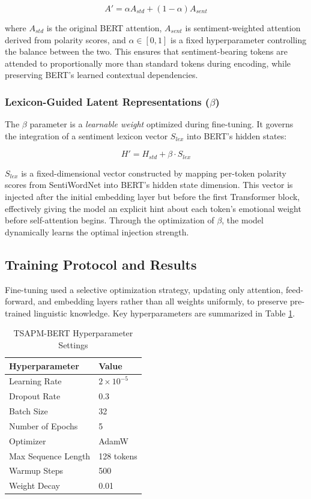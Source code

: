 \documentclass[a4paper,12pt]{article}
\begin{document}
\begin{equation}
    A' = \alpha A_{std} + (1 - \alpha)A_{sent}
\end{equation}

where $A_{std}$ is the original BERT attention, $A_{sent}$ is sentiment-weighted attention derived from polarity scores, and $\alpha \in [0, 1]$ is a fixed hyperparameter controlling the balance between the two. This ensures that sentiment-bearing tokens are attended to proportionally more than standard tokens during encoding, while preserving BERT's learned contextual dependencies.

\subsubsection{Lexicon-Guided Latent Representations ($\beta$)}
The $\beta$ parameter is a \textit{learnable weight} optimized during fine-tuning. It governs the integration of a sentiment lexicon vector $S_{lex}$ into BERT's hidden states:

\begin{equation}
    H' = H_{std} + \beta \cdot S_{lex}
\end{equation}

$S_{lex}$ is a fixed-dimensional vector constructed by mapping per-token polarity scores from SentiWordNet into BERT's hidden state dimension. This vector is injected after the initial embedding layer but before the first Transformer block, effectively giving the model an explicit hint about each token's emotional weight before self-attention begins. Through the optimization of $\beta$, the model dynamically learns the optimal injection strength.

\subsection{Training Protocol and Results}
Fine-tuning used a selective optimization strategy, updating only attention, feed-forward, and embedding layers rather than all weights uniformly, to preserve pre-trained linguistic knowledge. Key hyperparameters are summarized in Table \ref{tab:hyperparameters}.

\begin{table}[H]
\centering
\caption{TSAPM-BERT Hyperparameter Settings}
\label{tab:hyperparameters}
\begin{tabular}{|l|l|}
\hline
\textbf{Hyperparameter} & \textbf{Value} \\ \hline
Learning Rate           & $2 \times 10^{-5}$ \\ \hline
Dropout Rate            & 0.3 \\ \hline
Batch Size              & 32 \\ \hline
Number of Epochs        & 5 \\ \hline
Optimizer               & AdamW  \\ \hline
Max Sequence Length     & 128 tokens  \\ \hline
Warmup Steps            & 500  \\ \hline
Weight Decay            & 0.01  \\ \hline
\end{tabular}
\end{table}
\end{document}
